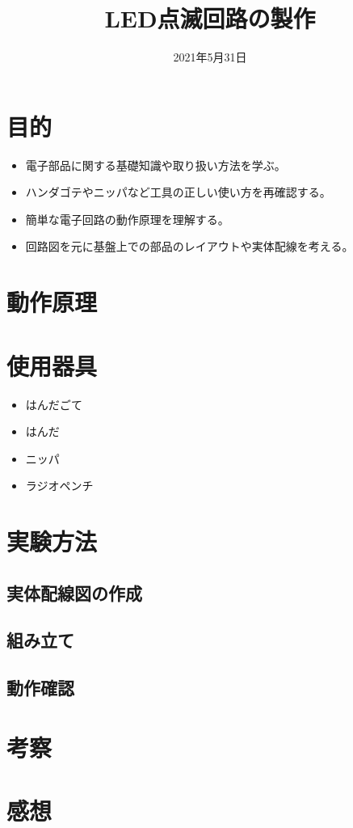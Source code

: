 \documentclass[titlepage]{jarticle}
\title{LED点滅回路の製作}
\author{}
\date{2021年5月31日}
\begin{document}
\maketitle

\section{目的}
\begin{itemize}
  \item 電子部品に関する基礎知識や取り扱い方法を学ぶ。
  \item ハンダゴテやニッパなど工具の正しい使い方を再確認する。
  \item 簡単な電子回路の動作原理を理解する。
  \item 回路図を元に基盤上での部品のレイアウトや実体配線を考える。
\end{itemize}

\section{動作原理}

\section{使用器具}
	\begin{itemize}
		\item はんだごて
		\item はんだ
		\item ニッパ
		\item ラジオペンチ
	\end{itemize}

\section{実験方法}
  \subsection{実体配線図の作成}

  \subsection{組み立て}

  \subsection{動作確認}

\section{考察}

\section{感想}
\end{document}
